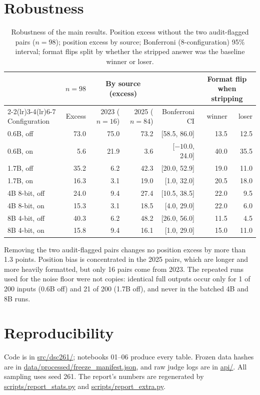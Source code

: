 \documentclass[10pt]{article}
\begin{document}
\section{Robustness}
\label{app:robust}
\begin{table}[H]
\centering\small
\setlength{\tabcolsep}{4pt}
\caption{Robustness of the main results. Position excess without the two audit-flagged pairs ($n=98$); position
excess by source; Bonferroni (8-configuration) 95\% interval; format flips split by whether the stripped answer
was the baseline winner or loser.}
\label{tab:robust}
\begin{tabular}{l r rr r rr}
\toprule
& \multicolumn{1}{c}{$n=98$} & \multicolumn{2}{c}{By source (excess)} & & \multicolumn{2}{c}{Format flip when stripping} \\
\cmidrule(lr){2-2}\cmidrule(lr){3-4}\cmidrule(lr){6-7}
Configuration & Excess & 2023 ($n=16$) & 2025 ($n=84$) & Bonferroni CI & winner & loser \\
\midrule
0.6B, off & 73.0 & 75.0 & 73.2 & [58.5, 86.0] & 13.5 & 12.5 \\
0.6B, on & 5.6 & 21.9 & 3.6 & [$-10.0$, 24.0] & 40.0 & 35.5 \\
1.7B, off & 35.2 & 6.2 & 42.3 & [20.0, 52.9] & 19.0 & 11.0 \\
1.7B, on & 16.3 & 3.1 & 19.0 & [1.0, 32.0] & 20.5 & 18.0 \\
4B 8-bit, off & 24.0 & 9.4 & 27.4 & [10.5, 38.5] & 22.0 & 9.5 \\
4B 8-bit, on & 15.3 & 3.1 & 18.5 & [4.0, 29.0] & 22.0 & 6.0 \\
8B 4-bit, off & 40.3 & 6.2 & 48.2 & [26.0, 56.0] & 11.5 & 4.5 \\
8B 4-bit, on & 15.8 & 9.4 & 16.1 & [1.0, 29.0] & 15.0 & 11.0 \\
\bottomrule
\end{tabular}
\end{table}
Removing the two audit-flagged pairs changes no position excess by more than 1.3 points. Position bias is
concentrated in the 2025 pairs, which are longer and more heavily formatted, but only 16 pairs come from 2023.
The repeated runs used for the noise floor were not copies: identical full outputs occur only for 1 of 200 inputs
(0.6B off) and 21 of 200 (1.7B off), and never in the batched 4B and 8B runs.

\section{Reproducibility}
Code is in \url{src/dsc261/}; notebooks 01--06 produce every table. Frozen data hashes are in
\url{data/processed/freeze_manifest.json}, and raw judge logs are in \url{api/}. All sampling uses seed
261. The report's numbers are regenerated by \url{scripts/report_stats.py} and
\url{scripts/report_extra.py}.
\end{document}
